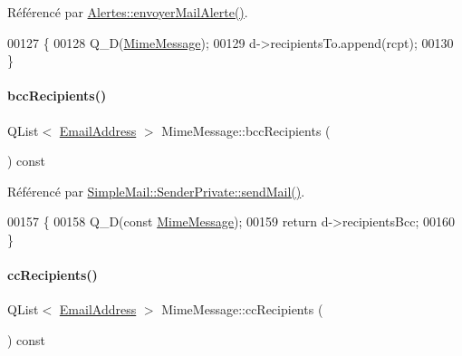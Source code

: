 Référencé par \hyperlink{class_alertes_a375783502a78109f3323dc1ed90cfdc9}{Alertes\+::envoyer\+Mail\+Alerte()}.


\begin{DoxyCode}
00127 \{
00128     Q\_D(\hyperlink{class_simple_mail_1_1_mime_message}{MimeMessage});
00129     d->recipientsTo.append(rcpt);
00130 \}
\end{DoxyCode}
\mbox{\label{class_simple_mail_1_1_mime_message_a160a1f92f2dd26e2154514fa51303db5}} 
\paragraph{\texorpdfstring{bcc\+Recipients()}{bccRecipients()}}
{\footnotesize\ttfamily Q\+List$<$ \hyperlink{class_simple_mail_1_1_email_address}{Email\+Address} $>$ Mime\+Message\+::bcc\+Recipients (\begin{DoxyParamCaption}{ }\end{DoxyParamCaption}) const}



Référencé par \hyperlink{class_simple_mail_1_1_sender_private_a2ede5284746e77ee37b8fe96f4bbb100}{Simple\+Mail\+::\+Sender\+Private\+::send\+Mail()}.


\begin{DoxyCode}
00157 \{
00158     Q\_D(\textcolor{keyword}{const} \hyperlink{class_simple_mail_1_1_mime_message}{MimeMessage});
00159     \textcolor{keywordflow}{return} d->recipientsBcc;
00160 \}
\end{DoxyCode}
\mbox{\label{class_simple_mail_1_1_mime_message_a69cf7d797c2405f31f50c6959c00a12f}} 
\paragraph{\texorpdfstring{cc\+Recipients()}{ccRecipients()}}
{\footnotesize\ttfamily Q\+List$<$ \hyperlink{class_simple_mail_1_1_email_address}{Email\+Address} $>$ Mime\+Message\+::cc\+Recipients (\begin{DoxyParamCaption}{ }\end{DoxyParamCaption}) const}



